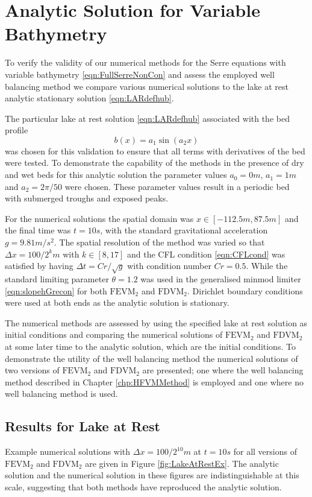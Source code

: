 \section{Analytic Solution for Variable Bathymetry}
To verify the validity of our numerical methods for the Serre equations with variable bathymetry \eqref{eqn:FullSerreNonCon} and assess the employed well balancing method we compare various numerical solutions to the lake at rest analytic stationary solution \eqref{eqn:LARdefhub}. 

The particular lake at rest solution \eqref{eqn:LARdefhub} associated with the bed profile
\begin{equation}
b(x) = a_1 \sin\left(a_2 x\right)
\end{equation}
was chosen for this validation to ensure that all terms with derivatives of the bed were tested. To demonstrate the capability of the methods in the presence of dry and wet beds for this analytic solution the parameter values $a_0 = 0m$, $a_1 = 1m$ and $a_2 = 2 \pi / 50 $ were chosen. These parameter values result in a periodic bed with submerged troughs and exposed peaks. 

For the numerical solutions the spatial domain was $x \in \left[-112.5 m,87.5 m\right]$ and the final time was $t=10s$, with the standard gravitational acceleration $g= 9.81 m/s^2$. The spatial resolution of the method was varied so that $\Delta x = 100 / 2^k m$ with $k \in \left[8,17\right]$ and the CFL condition \eqref{eqn:CFLcond} was satisfied by having $\Delta t = Cr / \sqrt{g}$ with condition number $Cr = 0.5$. While the standard limiting parameter $\theta = 1.2$ was used in the generalised minmod limiter \eqref{eqn:slopehGrecon} for both $\text{FEVM}_2$ and $\text{FDVM}_2$. Dirichlet boundary conditions were used at both ends as the analytic solution is stationary.

The numerical methods are assessed by using the specified lake at rest solution as initial conditions and comparing the numerical solutions of $\text{FEVM}_2$ and $\text{FDVM}_2$ at some later time to the analytic solution, which are the initial conditions. To demonstrate the utility of the well balancing method the numerical solutions of two versions of $\text{FEVM}_2$ and $\text{FDVM}_2$ are presented; one where the well balancing method described in Chapter \ref{chp:HFVMMethod} is employed and one where no well balancing method is used.   

\subsection{Results for Lake at Rest}
Example numerical solutions with $\Delta x = 100/2^{10}m$ at $t=10s$ for all versions of $\text{FEVM}_2$ and $\text{FDVM}_2$ are given in Figure \ref{fig:LakeAtRestEx}. The analytic solution and the numerical solution in these figures are indistinguishable at this scale, suggesting that both methods have reproduced the analytic solution.  

